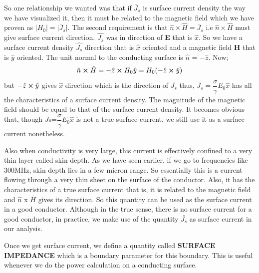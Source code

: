 So one relationship we wanted was that if $\bar{J}_s$ is surface current density the way we have visualized it, then it must be related to the magnetic field which we have proven as $\lvert H_0\rvert=\lvert\bar{J}_s\rvert$. The second requirement is that $\hat{n}\times\hat{H}=\bar{J}_s$ i.e $\hat{n}\times\hat{H}$  must give surface current direction. $\hat{J_{s}}$ was in direction of \textbf{E} that is $\hat{x}$. So we have a surface current density $\hat{J_{s}}$ direction that is  $\hat{x}$ oriented and a magnetic field \textbf{H} that is $\hat{y}$ oriented. The unit normal to the conducting surface is $\hat{n}$ = $-\hat{z}$. Now;
\begin{equation*}
\hat{n} \cross \hat{H} = -\hat{z} \cross H_{0}\hat{y} = H_{0}(-\hat{z} \cross \hat{y})
\end{equation*}
but $-\hat{z} \cross \hat{y}$ gives $\hat{x}$ direction which is the direction of $\bar{J_{s}}$
thus, $\bar{J}_s = \dfrac{\sigma}{\gamma}E_0\hat{x}$ has all the characteristics of a surface current density. The magnitude of the magnetic field should be equal to that of the surface current density. It becomes obvious that, though $\bar{J}$s=$\dfrac{\sigma}{\gamma}$$E_0$$\hat{x}$ is not a true surface current, we still use it as a surface current nonetheless.

Also when conductivity is very large, this current is effectively confined to a very thin layer called skin depth. As we have seen earlier, if we go to frequencies like 300MHz, skin depth lies in a few micron range. So essentially this is a current flowing through a very thin sheet on the surface of the conductor. Also, it has the characteristics of a true surface current that is, it is related to the magnetic field and $\hat{n}$ x $\bar{H}$ gives its direction. So this quantity can be used as the surface current in a good conductor. Although in the true sense, there is no surface current for a good conductor, in practice, we make use of the quantity $\bar{J_{s}}$ as surface current in our analysis.

Once we get surface current, we define a quantity called \textbf{SURFACE IMPEDANCE} which is a boundary parameter for this boundary. This is useful whenever we do the power calculation on a conducting surface.

